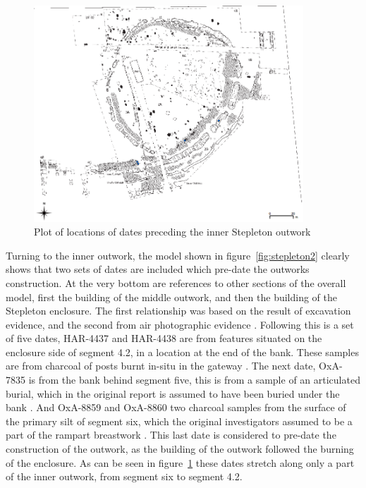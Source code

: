 \begin{figure}
\begin{center}
	\includegraphics[width=0.9\textwidth]{figures/stepleton-preoutwork}
\end{center}
  \caption{Plot of locations of dates preceding the inner Stepleton outwork}
  \label{fig:pre-outwork}
\end{figure}

Turning to the inner outwork, the model shown in figure~\ref{fig:stepleton2} clearly shows that two sets of dates are included which pre-date the outworks construction. At the very bottom are references to other sections of the overall model, first the building of the middle outwork, and then the building of the Stepleton enclosure. The first relationship was based on the result of excavation evidence, and the second from air photographic evidence \cite[395]{Mercer:2008fk}. Following this is a set of five dates, HAR-4437 and HAR-4438 are from features situated on the enclosure side of segment 4.2, in a location at the end of the bank. These samples are from charcoal of posts burnt in-situ in the gateway \cite[395]{Mercer:2008fk}. The next date, OxA-7835 is from the bank behind segment five, this is from a sample of an articulated burial, which in the original report is assumed to have been buried under the bank \cite[395]{Mercer:2008fk}. And OxA-8859 and OxA-8860 two charcoal samples from the surface of the primary silt of segment six, which the original investigators assumed to be a part of the rampart breastwork \cite[395]{Mercer:2008fk}. This last date is considered to pre-date the construction of the outwork, as the building of the outwork followed the burning of the enclosure. As can be seen in figure~\ref{fig:pre-outwork} these dates stretch along only a part of the inner outwork, from segment six to segment 4.2. 

